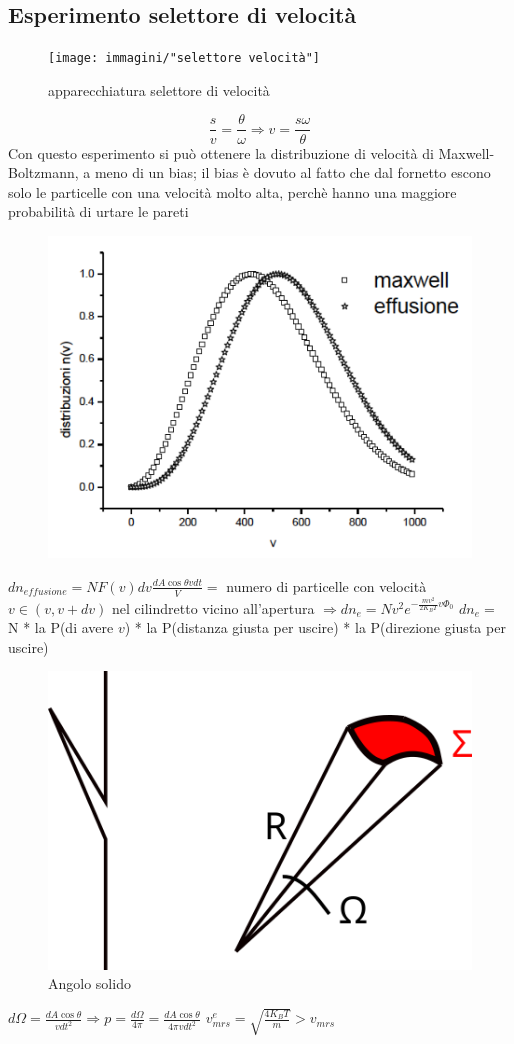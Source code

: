 \documentclass[a4paper,11pt]{report}
\begin{document}
	\subsection{Esperimento selettore di velocità}
		\begin{figure}[h]
			\centering
			\texttt{[image: immagini/"selettore velocità"]}
			\caption{apparecchiatura selettore di velocità}
			\label{fig:selettore-velocita}
		\end{figure}
		$$
		\frac{s}{v}=\frac{\theta}{\omega} \Rightarrow v = \frac{s\omega}{\theta}
		$$ 
		Con questo esperimento si può ottenere la distribuzione di velocità di Maxwell-Boltzmann, a meno di un bias; il bias è dovuto al fatto che dal fornetto escono solo le particelle con una velocità molto alta, perchè hanno una maggiore probabilità di urtare le pareti
\begin{figure}[h]
	\centering
	\includegraphics[width=0.5\linewidth]{immagini/effusione}
	\label{fig:effusione}
\end{figure}
		\newline $dn_{effusione} = NF(v)dv \frac{dA\cos\theta vdt}{V} =$ numero di particelle con velocità $v \in (v,v+dv)$ nel cilindretto vicino all'apertura $\Rightarrow dn_e = Nv^2 e^ {-\frac{mv^2}{2K_BT}v\Phi_0}$ \newline
		$dn_e =$ N * la P(di avere $v$) * la P(distanza giusta per uscire) * la P(direzione giusta per uscire)
\begin{figure}[h]
	\centering
	\includegraphics[width=0.3\linewidth]{immagini/angolo solido}
	\caption{Angolo solido}
	\label{fig:angolo-solido}
\end{figure}
		\newline $d\Omega = \frac{dA\cos\theta}{{vdt}^2} \Rightarrow p = \frac{d\Omega}{4\pi} = \frac{dA\cos\theta}{4\pi{vdt}^2}$ \newline
 		$v_{mrs}^e = \sqrt{\frac{4K_BT}{m}} > v_{mrs}$		
		
\end{document}

